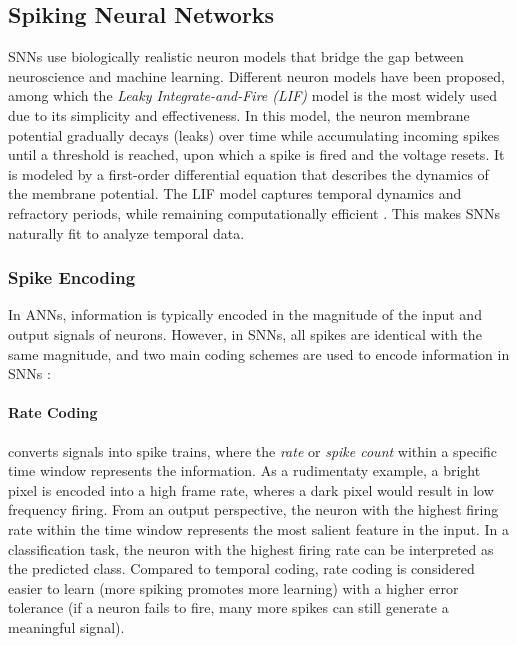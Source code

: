 \documentclass{article}
\begin{document}
\subsection{Spiking Neural Networks}
SNNs use biologically realistic neuron models that bridge the gap between neuroscience and machine learning. Different neuron models have been proposed, among which the \textit{Leaky Integrate-and-Fire (LIF)} model is the most widely used due to its simplicity and effectiveness. In this model, the neuron membrane potential gradually decays (leaks) over time while accumulating incoming spikes until a threshold is reached, upon which a spike is fired and the voltage resets. It is modeled by a first-order differential equation that describes the dynamics of the membrane potential. The LIF model captures temporal dynamics and refractory periods,  while remaining computationally efficient \cite{yamazakiSpikingNeuralNetworks2022, izhikevichSimpleModelSpiking2003, eshraghianTrainingSpikingNeural2023}. This makes SNNs naturally fit to analyze temporal data.

\subsubsection{Spike Encoding}
In ANNs, information is typically encoded in the magnitude of the input and output signals of neurons. However, in SNNs, all spikes are identical with the same magnitude, and two main coding schemes are used to encode information in SNNs \cite{eshraghianTrainingSpikingNeural2023}:

\paragraph {Rate Coding} converts signals into spike trains, where the \textit{rate} or \textit{spike count} within a specific time window represents the information. As a rudimentaty example, a bright pixel is encoded into a high frame rate, wheres a dark pixel would result in low frequency firing. From an output perspective, the neuron with the highest firing rate within the time window represents the most salient feature in the input. In a classification task, the neuron with the highest firing rate can be interpreted as the predicted class. Compared to temporal coding, rate coding is considered easier to learn (more spiking promotes more learning) with a higher error tolerance (if a neuron fails to fire, many more spikes can still generate a meaningful signal).
\end{document}
